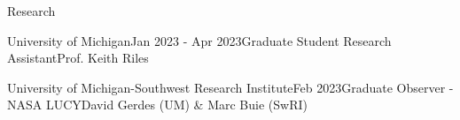 \documentclass{resume} %
\begin{document}
\begin{rSection}{Research}


\begin{rSubsection}{University of Michigan}{Jan 2023 - Apr 2023}{Graduate Student Research Assistant}{Prof. Keith Riles}
\end{rSubsection}

\begin{rSubsection}{University of Michigan-Southwest Research Institute}{Feb 2023}{Graduate Observer - NASA LUCY}{David Gerdes (UM) \& Marc Buie (SwRI)}
\end{rSubsection}


\end{rSection}
\end{document}
